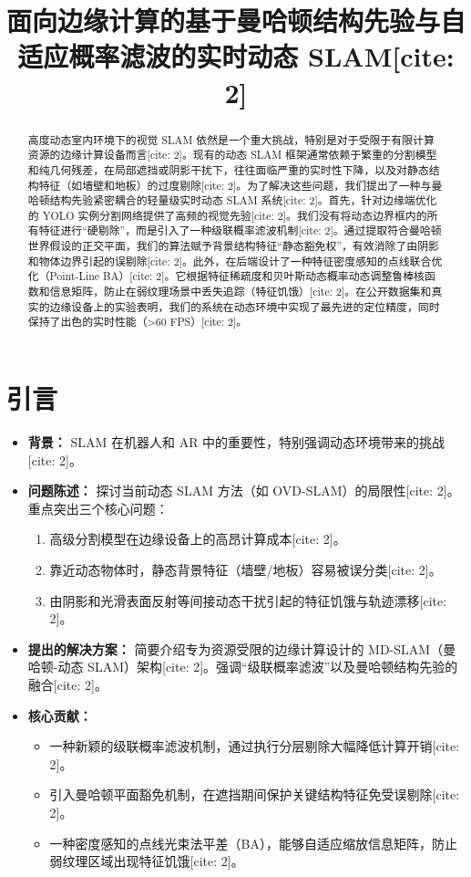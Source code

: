 \documentclass[12pt,a4paper]{ctexart}
\title{面向边缘计算的基于曼哈顿结构先验与自适应概率滤波的实时动态 SLAM[cite: 2]}
\author{}
\date{}
\begin{document}
\maketitle

\begin{abstract}
高度动态室内环境下的视觉 SLAM 依然是一个重大挑战，特别是对于受限于有限计算资源的边缘计算设备而言[cite: 2]。现有的动态 SLAM 框架通常依赖于繁重的分割模型和纯几何残差，在局部遮挡或阴影干扰下，往往面临严重的实时性下降，以及对静态结构特征（如墙壁和地板）的过度剔除[cite: 2]。为了解决这些问题，我们提出了一种与曼哈顿结构先验紧密耦合的轻量级实时动态 SLAM 系统[cite: 2]。首先，针对边缘端优化的 YOLO 实例分割网络提供了高频的视觉先验[cite: 2]。我们没有将动态边界框内的所有特征进行“硬剔除”，而是引入了一种级联概率滤波机制[cite: 2]。通过提取符合曼哈顿世界假设的正交平面，我们的算法赋予背景结构特征“静态豁免权”，有效消除了由阴影和物体边界引起的误剔除[cite: 2]。此外，在后端设计了一种特征密度感知的点线联合优化（Point-Line BA）[cite: 2]。它根据特征稀疏度和贝叶斯动态概率动态调整鲁棒核函数和信息矩阵，防止在弱纹理场景中丢失追踪（特征饥饿）[cite: 2]。在公开数据集和真实的边缘设备上的实验表明，我们的系统在动态环境中实现了最先进的定位精度，同时保持了出色的实时性能（>60 FPS）[cite: 2]。
\end{abstract}

\section{引言}
\begin{itemize}
    \item \textbf{背景：} SLAM 在机器人和 AR 中的重要性，特别强调动态环境带来的挑战[cite: 2]。
    \item \textbf{问题陈述：} 探讨当前动态 SLAM 方法（如 OVD-SLAM）的局限性[cite: 2]。重点突出三个核心问题：
    \begin{enumerate}
        \item 高级分割模型在边缘设备上的高昂计算成本[cite: 2]。
        \item 靠近动态物体时，静态背景特征（墙壁/地板）容易被误分类[cite: 2]。
        \item 由阴影和光滑表面反射等间接动态干扰引起的特征饥饿与轨迹漂移[cite: 2]。
    \end{enumerate}
    \item \textbf{提出的解决方案：} 简要介绍专为资源受限的边缘计算设计的 MD-SLAM（曼哈顿-动态 SLAM）架构[cite: 2]。强调“级联概率滤波”以及曼哈顿结构先验的融合[cite: 2]。
    \item \textbf{核心贡献：}
    \begin{itemize}
        \item 一种新颖的级联概率滤波机制，通过执行分层剔除大幅降低计算开销[cite: 2]。
        \item 引入曼哈顿平面豁免机制，在遮挡期间保护关键结构特征免受误剔除[cite: 2]。
        \item 一种密度感知的点线光束法平差（BA），能够自适应缩放信息矩阵，防止弱纹理区域出现特征饥饿[cite: 2]。
    \end{itemize}
\end{itemize}
\end{document}
